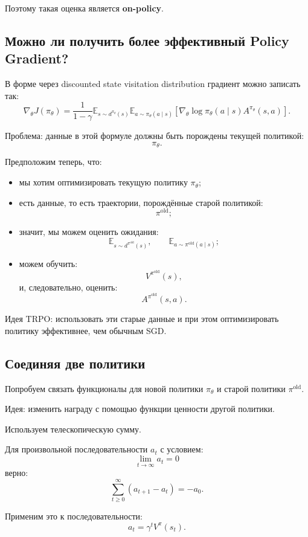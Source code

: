 \documentclass[12pt,a4paper]{article}
\begin{document}
Поэтому такая оценка является \textbf{on-policy}.

\subsection{Можно ли получить более эффективный Policy Gradient?}

В форме через discounted state visitation distribution градиент можно записать так:
\[
\nabla_\theta J(\pi_\theta)
=
\frac{1}{1-\gamma}
\mathbb E_{s\sim d^{\pi_\theta}(s)}
\mathbb E_{a\sim \pi_\theta(a\mid s)}
\left[
\nabla_\theta
\log \pi_\theta(a\mid s)
A^{\pi_\theta}(s,a)
\right].
\]

Проблема: данные в этой формуле должны быть порождены текущей политикой:
\[
\pi_\theta.
\]

Предположим теперь, что:
\begin{itemize}
    \item мы хотим оптимизировать текущую политику $\pi_\theta$;
    \item есть данные, то есть траектории, порождённые старой политикой:
    \[
    \pi^{\mathrm{old}};
    \]
    \item значит, мы можем оценить ожидания:
    \[
    \mathbb E_{s\sim d^{\pi^{\mathrm{old}}}(s)},
    \qquad
    \mathbb E_{a\sim \pi^{\mathrm{old}}(a\mid s)};
    \]
    \item можем обучить:
    \[
    V^{\pi^{\mathrm{old}}}(s),
    \]
    и, следовательно, оценить:
    \[
    A^{\pi^{\mathrm{old}}}(s,a).
    \]
\end{itemize}

Идея TRPO: использовать эти старые данные и при этом оптимизировать политику эффективнее, чем обычным SGD.

\subsection{Соединяя две политики}

Попробуем связать функционалы для новой политики $\pi_\theta$ и старой политики $\pi^{\mathrm{old}}$.

Идея: изменить награду с помощью функции ценности другой политики.

Используем телескопическую сумму.

Для произвольной последовательности $a_t$ с условием:
\[
\lim_{t\to\infty} a_t = 0
\]
верно:
\[
\sum_{t\ge 0}^{\infty}
(a_{t+1}-a_t)
=
-a_0.
\]

Применим это к последовательности:
\[
a_t
=
\gamma^t V^\pi(s_t).
\]
\end{document}
